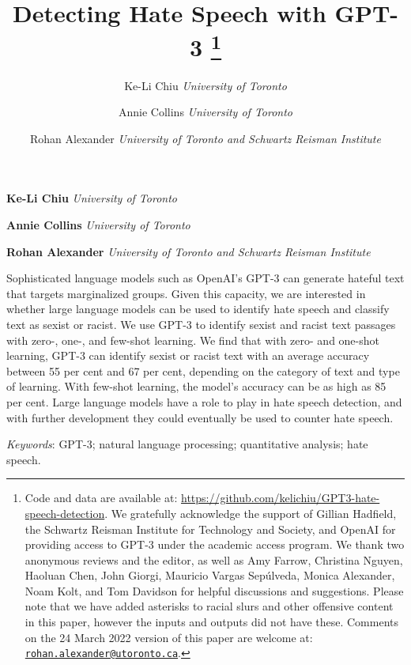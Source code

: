 \documentclass[12pt,]{article}
\title{Detecting Hate Speech with GPT-3 \thanks{Code and data are available at: \url{https://github.com/kelichiu/GPT3-hate-speech-detection}. We gratefully acknowledge the support of Gillian Hadfield, the Schwartz Reisman Institute for Technology and Society, and OpenAI for providing access to GPT-3 under the academic access program. We thank two anonymous reviews and the editor, as well as Amy Farrow, Christina Nguyen, Haoluan Chen, John Giorgi, Mauricio Vargas Sepúlveda, Monica Alexander, Noam Kolt, and Tom Davidson for helpful discussions and suggestions. Please note that we have added asterisks to racial slurs and other offensive content in this paper, however the inputs and outputs did not have these. Comments on the 24 March 2022 version of this paper are welcome at: \href{mailto:rohan.alexander@utoronto.ca}{\nolinkurl{rohan.alexander@utoronto.ca}}.}  }
\author{\Large Ke-Li Chiu\vspace{0.05in} \newline\normalsize\emph{University of Toronto}   \and \Large Annie Collins\vspace{0.05in} \newline\normalsize\emph{University of Toronto}   \and \Large Rohan Alexander\vspace{0.05in} \newline\normalsize\emph{University of Toronto and Schwartz Reisman Institute}  }
\date{}
\newcommand*{\authorfont}{\fontfamily{phv}\selectfont}
\renewenvironment{abstract}
 {{%
    \setlength{\leftmargin}{0mm}
    \setlength{\rightmargin}{\leftmargin}%
  }%
  \relax}
 {\endlist}
\begin{document}
	
%    


{%
\setlength{\parindent}{0pt}
\thispagestyle{plain}
{\fontsize{18}{20}\selectfont\raggedright 
\maketitle  %

}

{
   \vskip 13.5pt\relax \normalsize\fontsize{11}{12} 
\textbf{\authorfont Ke-Li Chiu} \hskip 15pt \emph{\small University of Toronto}   \par \textbf{\authorfont Annie Collins} \hskip 15pt \emph{\small University of Toronto}   \par \textbf{\authorfont Rohan Alexander} \hskip 15pt \emph{\small University of Toronto and Schwartz Reisman Institute}   

}

}








\begin{abstract}

    \hbox{\vrule height .2pt width 39.14pc}

    \vskip 8.5pt %

\noindent Sophisticated language models such as OpenAI's GPT-3 can generate hateful text that targets marginalized groups. Given this capacity, we are interested in whether large language models can be used to identify hate speech and classify text as sexist or racist. We use GPT-3 to identify sexist and racist text passages with zero-, one-, and few-shot learning. We find that with zero- and one-shot learning, GPT-3 can identify sexist or racist text with an average accuracy between 55 per cent and 67 per cent, depending on the category of text and type of learning. With few-shot learning, the model's accuracy can be as high as 85 per cent. Large language models have a role to play in hate speech detection, and with further development they could eventually be used to counter hate speech.


\vskip 8.5pt \noindent \emph{Keywords}: GPT-3; natural language processing; quantitative analysis; hate speech. \par

    \hbox{\vrule height .2pt width 39.14pc}



\end{abstract}
\end{document}
